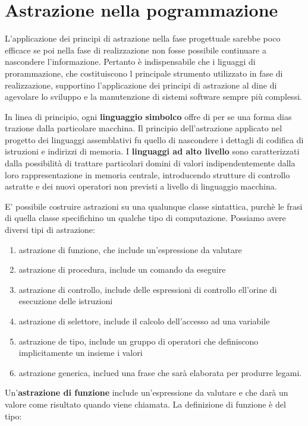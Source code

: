 \documentclass[a4paper,18pt]{extarticle}
\begin{document}
\newpage

\section{ Astrazione nella pogrammazione}

L'applicazione dei principi di astrazione nella fase progettuale sarebbe poco efficace se poi nella fase di realizzazione non fosse possibile continuare a nascondere l'informazione. Pertanto è indispensabile che i liguaggi di prorammazione, che costituiscono l principale strumento utilizzato in fase di realizzazione, supportino l'applicazione dei principi di astrazione al dine di agevolare lo sviluppo e la manutenzione di sistemi software sempre più complessi.

In linea di principio, ogni \textbf{linguaggio simbolco} offre di per se una forma dias trazione dalla particolare macchina. Il principio dell'astrazione applicato nel progetto dei linguaggi assemblativi fu quello di nascondere i dettagli di codifica di istruzioni e indirizzi di memoria. I \textbf{linguaggi ad alto livello} sono caratterizzati dalla possibilità di trattare particolari domini di valori indipendentemente dalla loro rappresentazione in memoria centrale, introducendo strutture di controllo astratte  e dei nuovi operatori non previsti a livello di linguaggio macchina.

E' possibile costruire astrazioni su una qualunque classe sintattica, purchè le frasi di quella classe specifichino un qualche tipo di computazione. Possiamo avere diversi tipi di astrazione:
\begin{enumerate}
    \item astrazione di funzione, che include un'espressione da valutare 
    \item astrazione di procedura, include un comando da eseguire
    \item astrazione di controllo, include delle espressioni di controllo ell'orine di esecuzione delle istruzioni
    \item astrazione di selettore, include il calcolo dell'accesso ad una variabile
    \item astrazione de tipo, include un gruppo di operatori che definiscono implicitamente un insieme i valori
    \item astrazione generica, inclued una frase che sarà elaborata per produrre legami.
\end{enumerate}

Un'\textbf{astrazione di funzione} include un'espressione da valutare e che darà un valore come risultato quando viene chiamata. La definizione di funzione è del tipo:
\end{document}
